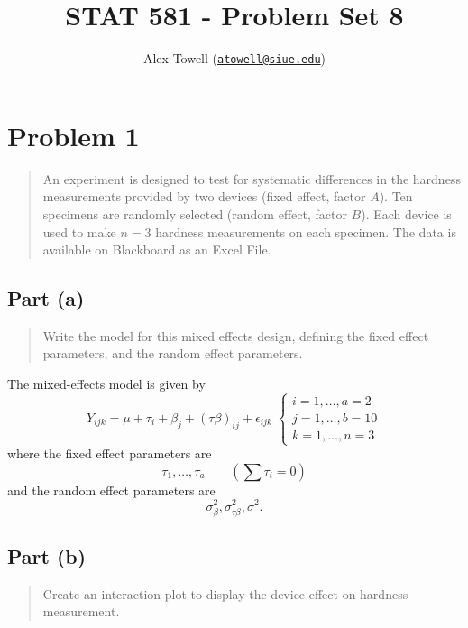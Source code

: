 \documentclass[
]{article}
\title{STAT 581 - Problem Set 8}
\author{Alex Towell
(\href{mailto:atowell@siue.edu}{\nolinkurl{atowell@siue.edu}})}
\date{}
\begin{document}
\maketitle

\hypertarget{problem-1}{%
\section{Problem 1}\label{problem-1}}

\begin{quote}
An experiment is designed to test for systematic differences in the
hardness measurements provided by two devices (fixed effect, factor
\(A\)). Ten specimens are randomly selected (random effect, factor
\(B\)). Each device is used to make \(n=3\) hardness measurements on
each specimen. The data is available on Blackboard as an Excel File.
\end{quote}

\hypertarget{part-a}{%
\subsection{Part (a)}\label{part-a}}

\begin{quote}
Write the model for this mixed effects design, defining the fixed effect
parameters, and the random effect parameters.
\end{quote}

The mixed-effects model is given by \[
  Y_{i j k} = \mu + \tau_i + \beta_j + (\tau\!\beta)_{i j} + \epsilon_{i j k}
  \;
  \begin{cases}
    i = 1,\ldots,a=2\\
    j = 1,\ldots,b=10\\
    k = 1,\ldots,n=3
  \end{cases}
\] where the fixed effect parameters are \[
  \tau_1,\ldots,\tau_a \qquad \left(\sum \tau_i = 0\right)
\] and the random effect parameters are \[
  \sigma_\beta^2, \sigma_{\tau\!\beta}^2, \sigma^2.
\]

\hypertarget{part-b}{%
\subsection{Part (b)}\label{part-b}}

\begin{quote}
Create an interaction plot to display the device effect on hardness
measurement.
\end{quote}
\end{document}

